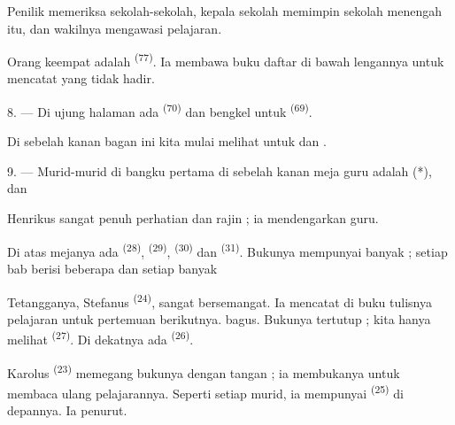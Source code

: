 Penilik memeriksa sekolah-sekolah, kepala sekolah memimpin sekolah
menengah itu, dan wakilnya mengawasi pelajaran.

Orang keempat adalah  \textsuperscript{(77)}. Ia
membawa buku daftar di bawah lengannya untuk mencatat yang tidak
hadir.

8. --- Di ujung halaman ada 
\textsuperscript{(70)} dan bengkel untuk 
\textsuperscript{(69)}.

Di sebelah kanan bagan ini kita mulai melihat  untuk  dan .


\VUsaut{2.4mm}

\VUsaut{3.0mm}

9. --- Murid-murid di bangku pertama di sebelah kanan meja guru
adalah  (*),  dan 

Henrikus sangat penuh perhatian dan rajin ; ia mendengarkan guru.

Di atas mejanya ada  \textsuperscript{(28)},
 \textsuperscript{(29)}, 
\textsuperscript{(30)} dan  \textsuperscript{(31)}.
Bukunya mempunyai banyak  ; setiap bab berisi beberapa
 dan setiap  banyak 

Tetangganya, Stefanus \textsuperscript{(24)}, sangat bersemangat. Ia
mencatat di buku tulisnya pelajaran untuk pertemuan berikutnya.
 bagus. Bukunya tertutup ; kita hanya melihat
 \textsuperscript{(27)}. Di dekatnya ada
 \textsuperscript{(26)}.

Karolus \textsuperscript{(23)} memegang bukunya dengan tangan ; ia
membukanya untuk membaca ulang pelajarannya. Seperti setiap murid, ia
mempunyai  \textsuperscript{(25)} di depannya. Ia
penurut.

